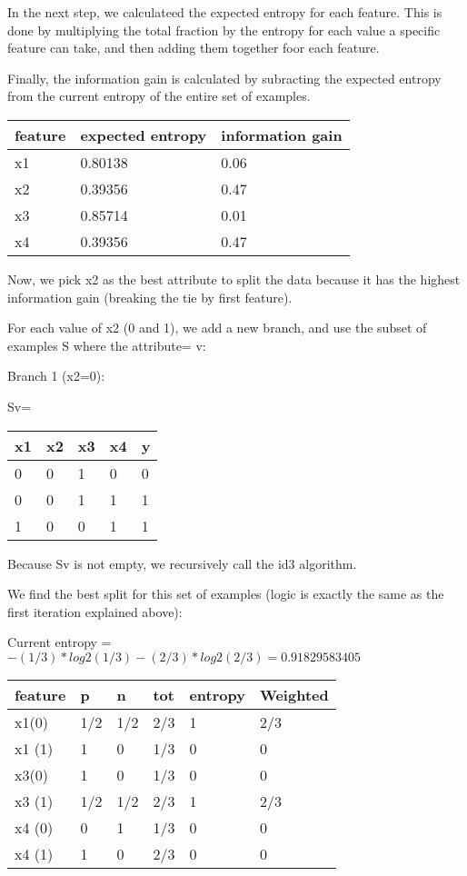 \documentclass[12pt, fullpage,letterpaper]{article}
\begin{document}
\begin{enumerate}
\begin{enumerate}
In the next step, we calculateed the expected entropy for each feature. This is done by multiplying the total fraction by the entropy for each value a specific feature can take, and then adding  them together foor each feature.

Finally, the information gain is calculated by subracting the expected entropy from the current entropy of the entire set of examples.


	\begin{tabular}{|l|l|l|}
	\hline
	feature & expected entropy & information gain \\ \hline
	x1      & 0.80138          & 0.06             \\ \hline
	x2      & 0.39356          & 0.47             \\ \hline
	x3      & 0.85714          & 0.01             \\ \hline
	x4      & 0.39356          & 0.47             \\ \hline
	\end{tabular}

Now, we pick x2 as the best attribute to split the data because it has the highest information gain (breaking the tie by first feature).

For each value of x2 (0 and 1), we add a new branch, and use the subset of examples S where the attribute= v:

Branch 1 (x2=0):

Sv=\begin{tabular}{|l|l|l|l|l|}
	\hline
	x1 & x2 & x3 & x4 & y \\ \hline
	0  & 0  & 1  & 0  & 0 \\ \hline
	0  & 0  & 1  & 1  & 1 \\ \hline
	1  & 0  & 0  & 1  & 1 \\ \hline
	\end{tabular}

Because Sv is not empty, we recursively call the id3 algorithm. 

We find the best split for this set of examples (logic is exactly the same as the first iteration explained above):

Current entropy = $-(1/3)*log2(1/3)-(2/3)*log2(2/3)=0.91829583405$

\begin{tabular}{|l|l|l|l|l|l|}
	\hline
	feature & p   & n   & tot & entropy & Weighted \\ \hline
	x1(0)   & 1/2 & 1/2 & 2/3 & 1       & 2/3      \\ \hline
	x1 (1)  & 1   & 0   & 1/3 & 0       & 0        \\ \hline
	x3(0)   & 1   & 0   & 1/3 & 0       & 0        \\ \hline
	x3 (1)  & 1/2 & 1/2 & 2/3 & 1       & 2/3      \\ \hline
	x4 (0)  & 0   & 1   & 1/3 & 0       & 0        \\ \hline
	x4 (1)  & 1   & 0   & 2/3 & 0       & 0        \\ \hline
	\end{tabular}



\end{enumerate}
\end{enumerate}
\end{document}
